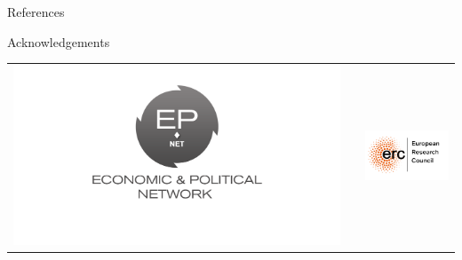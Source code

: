 \documentclass[final]{beamer}
\newlength{\onecolwid}
\begin{document}
\begin{frame}[t]
\begin{columns}[t]
\begin{column}{\onecolwid}
\begin{block}{References}
\begin{thebibliography}{50}
\end{thebibliography}
%	

\end{block}



\begin{block}{Acknowledgements}

\small{}

\end{block}




\begin{center}
\begin{tabular}{ccc}
\includegraphics[width=0.52\linewidth]{images/epnet.png} & \hfill & \includegraphics[width=0.5\linewidth]{images/erc.png}
\end{tabular}
\end{center}


\end{column} %

\end{columns} %

\end{frame} %
\end{document}

